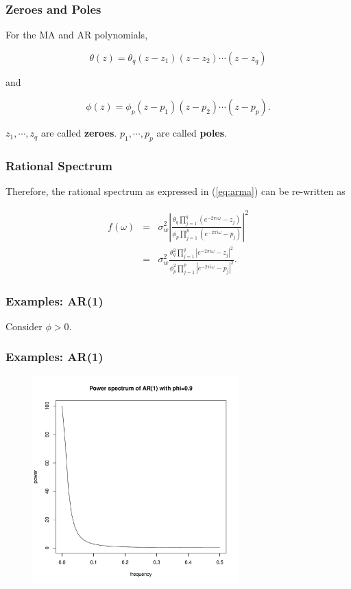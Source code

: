 \documentclass[%
xcolor=pdftex]{beamer}
\begin{document}
\begin{frame}
\frametitle{Zeroes and Poles}

For the MA and AR polynomials,

$$
\theta(z) = \theta_q(z-z_1)(z-z_2)\cdots(z-z_q)
$$

and

$$
\phi(z) = \phi_p(z-p_1)(z-p_2)\cdots(z-p_p).
$$

$z_1,\cdots, z_q$ are called \textbf{zeroes}. $p_1,\cdots,p_p$ are called \textbf{poles}.

\end{frame}

\begin{frame}
\frametitle{Rational Spectrum}

Therefore, the rational spectrum as expressed in (\ref{eq:arma}) can be re-written as

\begin{eqnarray} \label{eq:poles}
f(\omega) &=& \sigma_w^2  \left\lvert \frac{\theta_q \prod_{j=1}^q \left( e^{-2 \pi i \omega} - z_j \right)}{\phi_p \prod_{j=1}^p \left( e^{-2 \pi i \omega} - p_j \right)} \right\rvert  ^2 \nonumber \\
          &=& \sigma_w^2 \frac{\theta_q^2 \prod_{j=1}^q \left\lvert e^{-2 \pi i \omega} - z_j \right\rvert ^2}{\phi_p^2 \prod_{j=1}^p \left\lvert e^{-2 \pi i \omega} - p_j \right\rvert ^2}.
\end{eqnarray}

\end{frame}


\begin{frame}
\frametitle{Examples: AR(1)}

Consider $\phi>0$.

\vspace{50mm}

\end{frame}

\begin{frame}
\frametitle{Examples: AR(1)}

\includegraphics[width=100mm, height=80mm]{ar1_1power.pdf}

\end{frame}
\end{document}
